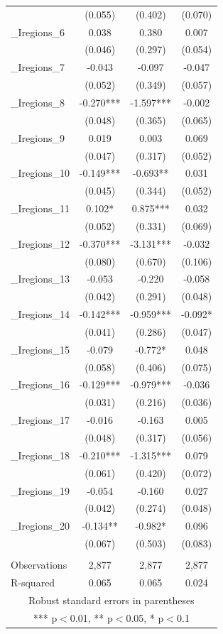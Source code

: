 \documentclass[]{article}
\begin{document}
\begin{tabular}{lccc}
 & (0.055) & (0.402) & (0.070) \\
\_Iregions\_6 & 0.038 & 0.380 & 0.007 \\
 & (0.046) & (0.297) & (0.054) \\
\_Iregions\_7 & -0.043 & -0.097 & -0.047 \\
 & (0.052) & (0.349) & (0.057) \\
\_Iregions\_8 & -0.270*** & -1.597*** & -0.002 \\
 & (0.048) & (0.365) & (0.065) \\
\_Iregions\_9 & 0.019 & 0.003 & 0.069 \\
 & (0.047) & (0.317) & (0.052) \\
\_Iregions\_10 & -0.149*** & -0.693** & 0.031 \\
 & (0.045) & (0.344) & (0.052) \\
\_Iregions\_11 & 0.102* & 0.875*** & 0.032 \\
 & (0.052) & (0.331) & (0.069) \\
\_Iregions\_12 & -0.370*** & -3.131*** & -0.032 \\
 & (0.080) & (0.670) & (0.106) \\
\_Iregions\_13 & -0.053 & -0.220 & -0.058 \\
 & (0.042) & (0.291) & (0.048) \\
\_Iregions\_14 & -0.142*** & -0.959*** & -0.092* \\
 & (0.041) & (0.286) & (0.047) \\
\_Iregions\_15 & -0.079 & -0.772* & 0.048 \\
 & (0.058) & (0.406) & (0.075) \\
\_Iregions\_16 & -0.129*** & -0.979*** & -0.036 \\
 & (0.031) & (0.216) & (0.036) \\
\_Iregions\_17 & -0.016 & -0.163 & 0.005 \\
 & (0.048) & (0.317) & (0.056) \\
\_Iregions\_18 & -0.210*** & -1.315*** & 0.079 \\
 & (0.061) & (0.420) & (0.072) \\
\_Iregions\_19 & -0.054 & -0.160 & 0.027 \\
 & (0.042) & (0.274) & (0.048) \\
\_Iregions\_20 & -0.134** & -0.982* & 0.096 \\
 & (0.067) & (0.503) & (0.083) \\
 &  &  &  \\
Observations & 2,877 & 2,877 & 2,877 \\
 R-squared & 0.065 & 0.065 & 0.024 \\ \hline
\multicolumn{4}{c}{ Robust standard errors in parentheses} \\
\multicolumn{4}{c}{ *** p$<$0.01, ** p$<$0.05, * p$<$0.1} \\
\end{tabular}
\end{document}
